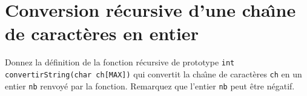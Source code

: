 \section{Conversion r\'ecursive d'une cha\^\i{}ne de caract\`eres en entier} 
Donnez la d\'efinition de la fonction r\'ecursive de prototype \texttt{int
 convertirString(char ch[MAX])} qui convertit la cha\^\i{}ne de
 caract\`eres \texttt{ch} en un entier \texttt{nb} renvoy\'e par la fonction.
 Remarquez que l'entier \texttt{nb} peut \^etre n\'egatif.
